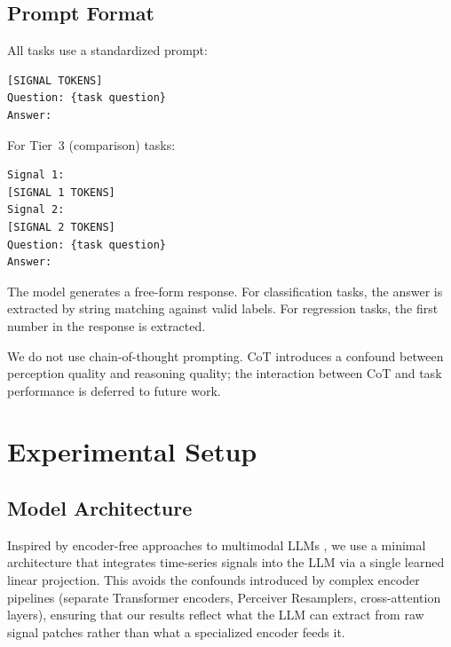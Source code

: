 \documentclass[11pt]{article}
\begin{document}
\subsection{Prompt Format}
\label{sec:prompt}

All tasks use a standardized prompt:
\begin{verbatim}
[SIGNAL TOKENS]
Question: {task question}
Answer:
\end{verbatim}

\noindent For Tier~3 (comparison) tasks:
\begin{verbatim}
Signal 1:
[SIGNAL 1 TOKENS]
Signal 2:
[SIGNAL 2 TOKENS]
Question: {task question}
Answer:
\end{verbatim}

The model generates a free-form response. For classification tasks, the answer is extracted by string matching against valid labels. For regression tasks, the first number in the response is extracted.

We do not use chain-of-thought prompting. CoT introduces a confound between perception quality and reasoning quality; the interaction between CoT and task performance is deferred to future work.


\section{Experimental Setup}
\label{sec:setup}

\subsection{Model Architecture}

Inspired by encoder-free approaches to multimodal LLMs \citep{han2026elf}, we use a minimal architecture that integrates time-series signals into the LLM via a single learned linear projection. This avoids the confounds introduced by complex encoder pipelines (separate Transformer encoders, Perceiver Resamplers, cross-attention layers), ensuring that our results reflect what the LLM can extract from raw signal patches rather than what a specialized encoder feeds it.
\end{document}
